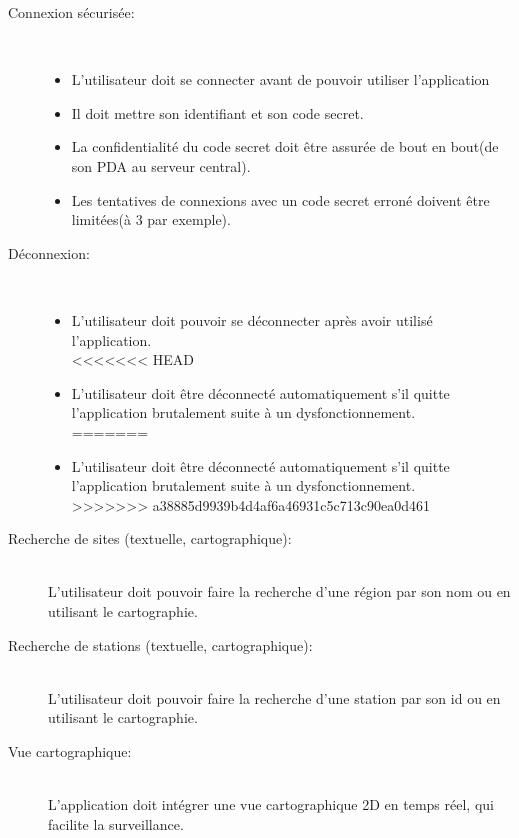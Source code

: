 \begin{description}
\item [Connexion sécurisée:] \hfill\\
	\begin{itemize}
	\item L'utilisateur doit se connecter avant de pouvoir utiliser l'application\\
	\item Il doit mettre son identifiant et son code secret.\\
	\item La confidentialité du code secret doit être assurée de bout en bout(de son PDA au serveur central).\\
	\item Les tentatives de connexions avec un code secret erroné doivent être limitées(à 3 par exemple).
	\end{itemize}

\item [Déconnexion:]\hfill\\
	\begin{itemize}
	\item L'utilisateur doit pouvoir se déconnecter après avoir utilisé l'application.\\
<<<<<<< HEAD
	\item L'utilisateur doit être déconnecté automatiquement s'il quitte l'application 
	brutalement suite à un dysfonctionnement.\\
=======
	\item L'utilisateur doit être déconnecté automatiquement s'il quitte l'application brutalement suite à un dysfonctionnement.\\
>>>>>>> a38885d9939b4d4af6a46931c5c713c90ea0d461
	\end{itemize}

\item [Recherche de sites (textuelle, cartographique):]\\
L'utilisateur doit pouvoir faire la recherche d'une région par son nom ou en utilisant le cartographie.\\

\item  [Recherche de stations (textuelle, cartographique):]\\ 
L'utilisateur doit pouvoir faire la recherche d'une station par son id ou en utilisant le cartographie.\\

\item [Vue cartographique:]\\
L'application doit intégrer une vue cartographique 2D en temps réel, qui facilite la surveillance.\\


\end{description}
